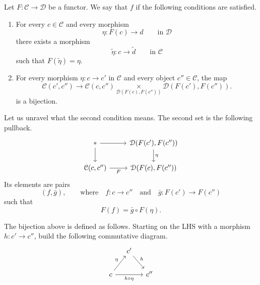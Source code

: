 \documentclass[main.tex]{subfiles}
\begin{document}
\begin{definition}
  \label{def:cofibrant_in_groupoids}
  Let $F\colon \mathcal{C} \to \mathcal{D}$ be a functor. We say that $f$  if the following conditions are satisfied.
  \begin{enumerate}
    \item For every $c \in \mathcal{C}$ and every morphism
      \begin{equation*}
        \eta\colon F(c) \to d \qquad\text{in }\mathcal{D}
      \end{equation*}
      there exists a morphism
      \begin{equation*}
        \tilde{\eta}\colon c \to \tilde{d}\qquad\text{in }\mathcal{C}
      \end{equation*}
      such that $F(\tilde{\eta}) = \eta$.

    \item For every morphism $\eta\colon c \to c'$ in $\mathcal{C}$ and every object $c'' \in \mathcal{C}$, the map
      \begin{equation*}
        \mathcal{C}(c', c'') \to\mathcal{C}(c, c'') \underset{\mathcal{D}(F(c), F(c''))}{\times}\mathcal{D}(F(c'), F(c'')).
      \end{equation*}
      is a bijection.
  \end{enumerate}
\end{definition}

Let us unravel what the second condition means. The second set is the following pullback.
\begin{equation*}
  \begin{tikzcd}
    *
    \arrow[r]
    \arrow[d]
    &\mathcal{D}(F(c'), F(c''))
    \arrow[d, "\eta"]
    \\
    \mathcal{C}(c, c'')
    \arrow[r, swap, "F"]
    &\mathcal{D}(F(c), F(c''))
  \end{tikzcd}
\end{equation*}
Its elements are pairs
\begin{equation*}
  (f, \bar{g}),\qquad \text{where}\quad f\colon c \to c''\quad \text{and}\quad \bar{g}\colon F(c') \to F(c'')
\end{equation*}
such that
\begin{equation*}
  F(f) = \bar{g} \circ F(\eta).
\end{equation*}

The bijection above is defined as follows. Starting on the LHS with a morphism $h\colon c' \to c''$, build the following commutative diagram.
\begin{equation*}
  \begin{tikzcd}[column sep=small]
    & c'
    \arrow[dr, "h"]
    \\
    c
    \arrow[ur, "\eta"]
    \arrow[rr, swap, "h \circ \eta"]
    && c''
  \end{tikzcd}
\end{equation*}
\end{document}
